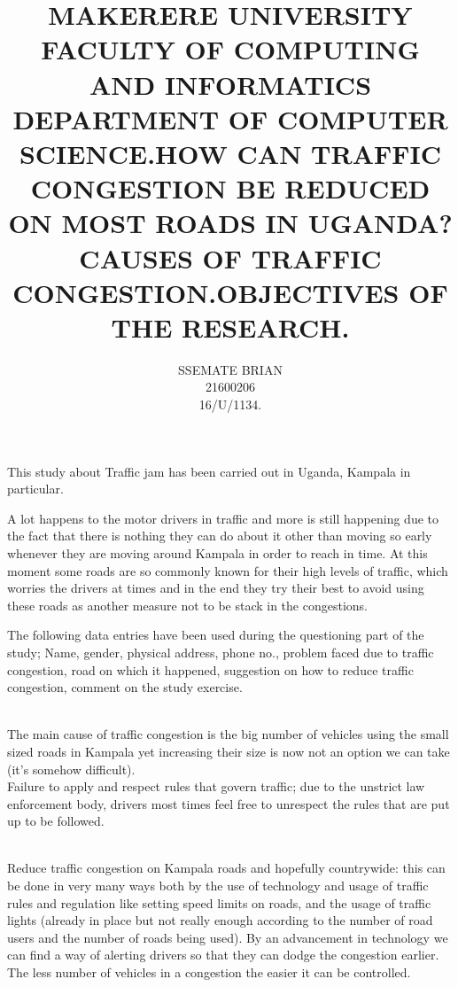 \documentclass[11pt]{article}
\title{\textbf{MAKERERE UNIVERSITY \\FACULTY OF COMPUTING AND INFORMATICS\\DEPARTMENT OF COMPUTER SCIENCE.}}
\author{SSEMATE BRIAN\\21600206\\16/U/1134.}
\date{}
\begin{document}
\maketitle

\title{\textbf{HOW CAN TRAFFIC CONGESTION BE REDUCED ON MOST ROADS IN UGANDA?}}

This study about Traffic jam has been carried out in Uganda, Kampala in particular.

 A lot happens to the motor drivers in traffic and more is still happening due to the fact that there is nothing they can do about it other than moving so early whenever they are moving around Kampala in order to reach in time. At this moment some roads are so commonly known for their high levels of traffic, which worries the drivers at times and in the end they try their best to avoid using these roads as another measure not to be stack in the congestions. 

The following data entries have been used during the questioning part of the study; Name, gender, physical address, phone no., problem faced due to traffic congestion, road on which it happened, suggestion on how to reduce traffic congestion, comment on the study exercise.\\


\title{\textbf{CAUSES OF TRAFFIC CONGESTION.}}\\

The main cause of traffic congestion is the big number of vehicles using the small sized roads in Kampala yet increasing their size is now not an option we can take (it’s somehow difficult).\\

Failure to apply and respect rules that govern traffic; due to the unstrict law enforcement body, drivers most times feel free to unrespect the rules that are put up to be followed.\\


\title{\textbf{OBJECTIVES OF THE RESEARCH.}}\\

Reduce traffic congestion on Kampala roads and hopefully countrywide: this can be done in very many ways both by the use of technology and usage of traffic rules and regulation like setting speed limits on roads, and the usage of traffic lights (already in place but not really enough according to the number of road users and the number of roads being used). By an advancement in technology we can find a way of alerting drivers so that they can dodge the congestion earlier. The less number of vehicles in a congestion the easier it can be controlled.\\
\end{document}
